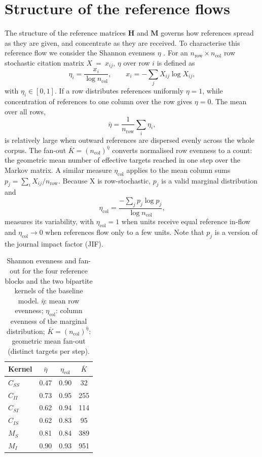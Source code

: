 \section{Structure of the reference flows}
\label{sec:flows}

The structure of the reference matrices $\mathbf{H}$ and $\mathbf{M}$ governs how references spread as they are given, and concentrate as they are received. To characterise this reference flow we consider the Shannon evenness $\eta$ \citep{stirlingGeneralFrameworkAnalysing2007}. For an $n_{\text{row}}\times n_{\text{col}}$ row stochastic citation matrix $X~=~x_{ij}$, $\eta$ over row $i$ is defined as 
\begin{equation}
  \eta_i = \frac{x_i}{\log n_{\text{col}}}, \qquad
  x_i = -\sum_j X_{ij}\log X_{ij},
  \label{eq:row_evenness}
\end{equation}
with $\eta_i\in[0,1]$. If a row distributes references uniformly $\eta=1$, while concentration of references to one column over the row gives $\eta=0$. The mean over all rows,
\begin{equation}
  \bar{\eta} = \frac{1}{n_{\text{row}}}\sum_i \eta_i,
  \label{eq:eta_bar}
\end{equation}
is relatively large when outward references are dispersed evenly across the whole corpus. The fan-out $\bar{K} = (n_{\text{col}})^{\bar{\eta}}$ converts normalised row evenness to a count: the geometric mean number of effective targets reached in one step over the Markov matrix.
A similar measure $\eta_{\text{col}}$ applies to the mean column sums $p_j = \sum_iX_{ij} / n_{\text{row}}$. Because X is row-stochastic, $p_j$ is a valid marginal distribution and
\begin{equation}
  \eta_{\text{col}} = \frac{-\sum_j p_j \log p_j}{\log n_{\text{col}}},
  \label{eq:eta_col}
\end{equation}
measures its variability, with $\eta_{\text{col}}=1$ when units receive equal reference in-flow and $\eta_{\text{col}}\to 0$ when references flow only to a few units. Note that $p_j$ is a version of the journal impact factor (JIF). 

\begin{table}[htbp]
\centering
\caption{Shannon evenness and fan-out for the four reference blocks and the two bipartite kernels of the baseline model.
  $\bar{\eta}$: mean row evenness; $\eta_{\text{col}}$: column evenness of the
  marginal distribution; $\bar{K} = (n_{\text{col}})^{\bar{\eta}}$: geometric
  mean fan-out (distinct targets per step).}
\label{tab:kernel_structure}
\begin{tabular}{lccc}
\toprule
Kernel & $\bar{\eta}$ & $\eta_{\text{col}}$ & $\bar{K}$ \\
\midrule
$C_{SS}$ & 0.47 & 0.90 & 32 \\
$C_{II}$ & 0.73 & 0.95 & 255 \\
$C_{SI}$ & 0.62 & 0.94 & 114 \\
$C_{IS}$ & 0.62 & 0.83 & 95 \\
\midrule
$M_S$ & 0.81 & 0.84 & 389 \\
\midrule
$M_I$ & 0.90 & 0.93 & 951 \\
\bottomrule
\end{tabular}
\end{table}

